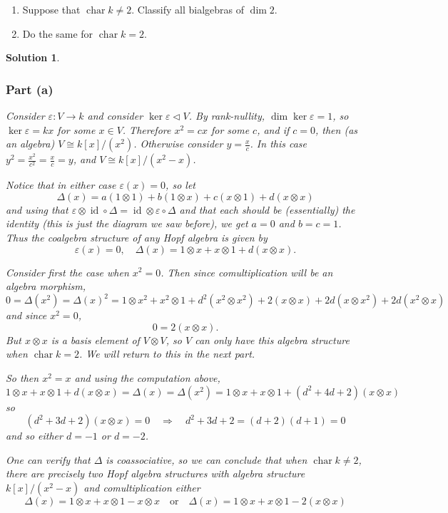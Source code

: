 \documentclass[12pt]{article}
\theoremstyle{break}
\theoremstyle{nonumberbreak}
\newtheorem{sol}{Solution}
\theoremstyle{changebreak}
\theoremstyle{break}
\theoremstyle{nonumberbreak}
\theoremstyle{nonumberplain}
\theoremstyle{change}
\DeclareMathOperator{\ch}{char}
\DeclareMathOperator{\id}{id}
\begin{document}
\begin{prob}
	\begin{enumerate}
		\item Suppose that $\ch k\ne 2$. Classify all bialgebras of $\dim 2.$
		\item Do the same for $\ch k = 2.$
	\end{enumerate}
\end{prob}
\begin{sol}
	\subsubsection*{Part (a)}
	Consider $\varepsilon:V\to k$ and consider $\ker\varepsilon\lhd V$. By rank-nullity, $\dim\ker\varepsilon= 1$, so
	$\ker\varepsilon=kx$ for some $x\in V$. Therefore $x^2=cx$ for some $c$, and if $c=0$, then (as an algebra) $V\cong k[x]/(x^2)$.
	Otherwise consider $y=\frac{x}{c}$. In this case $y^2=\frac{x^2}{c^2}=\frac{x}{c}=y$, and $V\cong k[x]/(x^2-x)$.

	Notice that in either case $\varepsilon(x)=0$, so let
	\[\Delta(x)=a(1\otimes 1)+b(1\otimes x)+c(x\otimes 1) + d(x\otimes x)\]
	and using that $\varepsilon\otimes \id\circ\Delta=\id\otimes\varepsilon\circ\Delta$
	and that each should be (essentially) the identity (this is just the diagram we saw before),
	we get $a=0$ and $b=c=1$. Thus the coalgebra structure of any Hopf algebra is given by 
	\[\varepsilon(x)=0,\quad \Delta(x)=1\otimes x+x\otimes 1+d(x\otimes x).\]

	Consider first the case when $x^2=0$. Then since comultiplication will be an algebra morphism,
	\[0=\Delta(x^2)=\Delta(x)^2=1\otimes x^2+x^2\otimes 1+d^2(x^2\otimes x^2)+2(x\otimes x)+2d(x\otimes x^2)+2d(x^2\otimes x)\]
	and since $x^2=0$, 
	\[0=2(x\otimes x).\]
	But $x\otimes x$ is a basis element of $V\otimes V$, so $V$ can only have this algebra structure
	when $\ch k=2$. We will return to this in the next part.

	So then $x^2=x$ and using the computation above,
	\[1\otimes x+x\otimes 1+d(x\otimes x)=\Delta(x)=\Delta(x^2)=1\otimes x+x\otimes 1+(d^2+4d+2)(x\otimes x)\]
	so
	\[(d^2+3d+2)(x\otimes x)=0\quad\Rightarrow\quad d^2+3d+2=(d+2)(d+1)=0\]
	and so either $d=-1$ or $d=-2$.

	One can verify that $\Delta$ is coassociative, so we can conclude that when $\ch k\ne 2$, 
	there are precisely two Hopf algebra structures with algebra structure $k[x]/(x^2-x)$ and
	comultiplication either
	\[\Delta(x)=1\otimes x+x\otimes 1-x\otimes x\quad\text{or}\quad \Delta(x)=1\otimes x+x\otimes 1-2(x\otimes x)\]


\end{sol}
\end{document}
